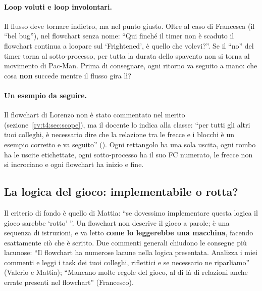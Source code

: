 \paragraph{Loop voluti e loop involontari.} Il flusso deve tornare indietro,
ma nel punto giusto. Oltre al caso di Francesca (il ``bel bug''), nel flowchart
senza nome: ``Qui finché il timer non è scaduto il flowchart continua a
loopare sul `Frightened', è quello che volevi?''. Se il ``no'' del timer torna
al sotto-processo, per tutta la durata dello spavento non si torna al
movimento di Pac-Man. Prima di consegnare, ogni ritorno va seguito a mano:
che cosa \textbf{non} succede mentre il flusso gira lì?

\paragraph{Un esempio da seguire.} Il flowchart di Lorenzo non è stato
commentato nel merito (sezione~\ref{rv:t4:sec:scope}), ma il docente lo
indica alla classe: ``per tutti gli altri tuoi colleghi, è necessario dire che
la relazione tra le frecce e i blocchi è un esempio corretto e va seguito''
(\rvBene). Ogni rettangolo ha una sola uscita, ogni rombo ha le uscite
etichettate, ogni sotto-processo ha il suo FC numerato, le frecce non si
incrociano e ogni flowchart ha inizio e fine.

\subsection{La logica del gioco: implementabile o rotta?}
\label{rv:t4:sec:logica}

Il criterio di fondo è quello di Mattia: ``se dovessimo implementare questa
logica il gioco sarebbe `rotto' ''. Un flowchart non descrive il gioco a
parole; è una sequenza di istruzioni, e va letto \textbf{come lo leggerebbe
una macchina}, facendo esattamente ciò che è scritto. Due commenti
generali chiudono le consegne più lacunose: ``Il flowchart ha numerose lacune
nella logica presentata. Analizza i miei commenti e leggi i task dei tuoi
colleghi, riflettici e se necessario ne riparliamo'' (Valerio e Mattia);
``Mancano molte regole del gioco, al di là di relazioni anche errate presenti
nel flowchart'' (Francesco).

